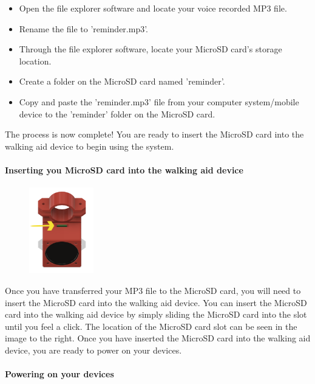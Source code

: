 				\begin{itemize}
					\item Open the file explorer software and locate your voice recorded MP3 file.
					\item Rename the file to 'reminder.mp3'.
					\item Through the file explorer software, locate your MicroSD card's storage location.
					\item Create a folder on the MicroSD card named 'reminder'.
					\item Copy and paste the 'reminder.mp3' file from your computer system/mobile device to the 'reminder' folder on the MicroSD card.
				\end{itemize}

				The process is now complete! You are ready to insert the MicroSD card into the walking aid device to begin using the system.

				\paragraph{Inserting you MicroSD card into the walking aid device}\mbox{}

				\begin{figure}
					\vspace{-3.5em}
					\centering
					\includegraphics[width=0.25\textwidth]{graphics/sd_arrow.png}
				\end{figure}

				Once you have transferred your MP3 file to the MicroSD card, you will need to insert the MicroSD card into the walking aid device. You can insert the MicroSD card into the walking aid device by simply sliding the MicroSD card into the slot until you feel a click. The location of the MicroSD card slot can be seen in the image to the right. Once you have inserted the MicroSD card into the walking aid device, you are ready to power on your devices.

				\paragraph{Powering on your devices}\mbox{}

